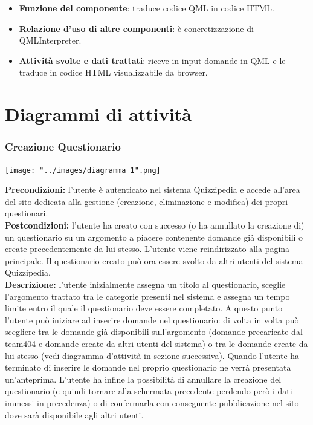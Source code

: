 \documentclass[a4paper,11pt]{article}
\begin{document}
			\begin{itemize}
				\item\textbf{Funzione del componente}: traduce codice QML in codice HTML.
				\item\textbf{Relazione d'uso di altre componenti}: è concretizzazione di QMLInterpreter.
				\item\textbf{Attività svolte e dati trattati}: riceve in input domande in QML e le traduce in codice HTML visualizzabile da browser.
			\end{itemize}
			\newpage	
	\section{Diagrammi di attività}
	
\subsubsection{Creazione Questionario}
\begin{center}
	\centerline{\texttt{[image: "../images/diagramma 1".png]}}
\end{center}
\textbf{Precondizioni:} l'utente è autenticato nel sistema Quizzipedia e accede all'area del sito dedicata alla gestione (creazione, eliminazione e modifica) dei propri questionari.\\
\textbf{Postcondizioni:} l'utente ha creato con successo (o ha annullato la creazione di) un questionario su un argomento a piacere contenente domande già disponibili o create precedentemente da lui stesso. L'utente viene reindirizzato alla pagina principale. Il questionario creato può ora essere svolto da altri utenti del sistema Quizzipedia.\\ %
\textbf{Descrizione:} l'utente inizialmente assegna un titolo al questionario, sceglie l'argomento trattato tra le categorie presenti nel sistema e assegna un tempo limite entro il quale il questionario deve essere completato. A questo punto l'utente può iniziare ad inserire domande nel questionario: di volta in volta può scegliere tra le domande già disponibili sull'argomento (domande precaricate dal team404 e domande create da altri utenti del sistema) o tra le domande create da lui stesso (vedi diagramma d'attività in sezione successiva). Quando l'utente ha terminato di inserire le domande nel proprio questionario ne verrà presentata un'anteprima. L'utente ha infine la possibilità di annullare la creazione del questionario (e quindi tornare alla schermata precedente perdendo però i dati immessi in precedenza) o di confermarla con conseguente pubblicazione nel sito dove sarà disponibile agli altri utenti.\\
\end{document}
